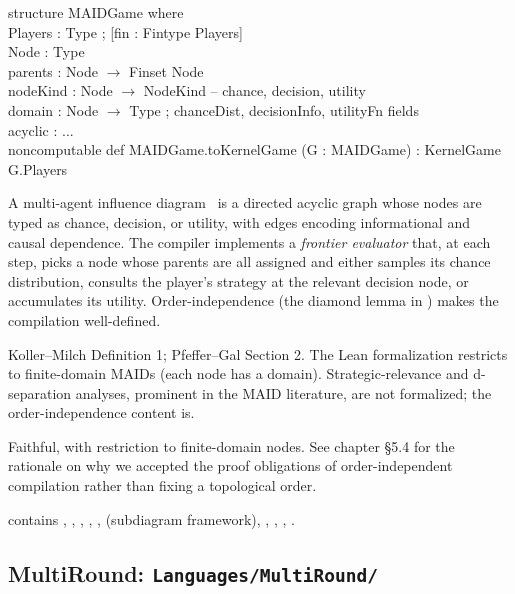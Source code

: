 \begin{leanbox}
structure MAIDGame where\\
\bd Players      : Type ; [fin : Fintype Players]\\
\bd Node         : Type\\
\bd parents      : Node $\to$ Finset Node\\
\bd nodeKind     : Node $\to$ NodeKind  -- chance, decision, utility\\
\bd domain       : Node $\to$ Type ; chanceDist, decisionInfo, utilityFn fields\\
\bd acyclic      : ...\\[3pt]
noncomputable def MAIDGame.toKernelGame (G : MAIDGame) : KernelGame G.Players
\end{leanbox}

\Mathematical
A multi-agent influence diagram~\citep{KollerMilch2003} is a
directed acyclic graph whose nodes are typed as chance, decision,
or utility, with edges encoding informational and causal
dependence.  The compiler implements a \emph{frontier evaluator}
that, at each step, picks a node whose parents are all assigned and
either samples its chance distribution, consults the player's
strategy at the relevant decision node, or accumulates its
utility.  Order-independence (the diamond lemma in
) makes the compilation
well-defined.

\Textbook
Koller–Milch Definition 1; Pfeffer–Gal Section 2.  The Lean
formalization restricts to finite-domain MAIDs (each node has a
 domain).  Strategic-relevance and d-separation
analyses, prominent in the MAID literature, are not formalized;
the order-independence content is.

\Faithfulness
Faithful, with restriction to finite-domain nodes.  See chapter
§5.4 for the rationale on why we accepted the proof obligations of
order-independent compilation rather than fixing a topological
order.

\Variants
{} contains , ,
, ,
,  (subdiagram framework),
, , ,
.

\subsection{MultiRound: \texttt{Languages/MultiRound/}}
\label{sec:supp:mr}\label{def:MultiRoundGame}

